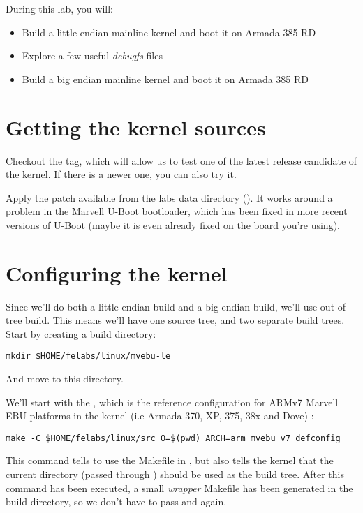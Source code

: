 
During this lab, you will:

\begin{itemize}
\item Build a little endian mainline kernel and boot it on Armada 385 RD
\item Explore a few useful {\em debugfs} files
\item Build a big endian mainline kernel and boot it on Armada 385 RD
\end{itemize}

\section{Getting the kernel sources}

Checkout the  tag, which will allow us to test one of
the latest release candidate of the kernel. If there is a newer one,
you can also try it.

Apply the  patch available from the labs data
directory (). It works around
a problem in the Marvell U-Boot bootloader, which has been fixed in
more recent versions of U-Boot (maybe it is even already fixed on the
board you're using).

\section{Configuring the kernel}

Since we'll do both a little endian build and a big endian build,
we'll use out of tree build. This means we'll have one source tree,
and two separate build trees. Start by creating a build directory:

\begin{verbatim}
mkdir $HOME/felabs/linux/mvebu-le
\end{verbatim}

And move to this directory.

We'll start with the , which is the reference
configuration for ARMv7 Marvell EBU platforms in the kernel (i.e
Armada 370, XP, 375, 38x and Dove) :

\begin{verbatim}
make -C $HOME/felabs/linux/src O=$(pwd) ARCH=arm mvebu_v7_defconfig
\end{verbatim}

This command tells  to use the Makefile in
, but also tells the kernel that the
current directory (passed through ) should be used as the
build tree. After this command has been executed, a small {\em
  wrapper} Makefile has been generated in the build directory, so we
don't have to pass  and  again.

